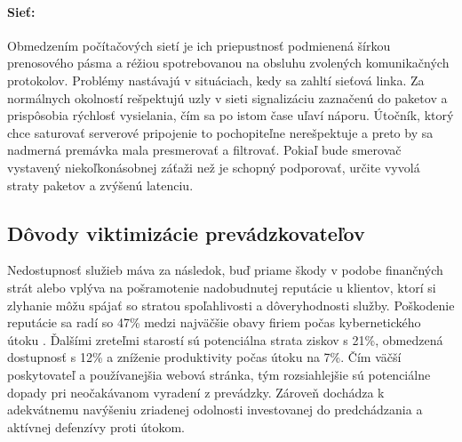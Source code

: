 \documentclass[12pt, a4paper]{article}
\begin{document}
\paragraph{Sieť:}
Obmedzením počítačových sietí je ich priepustnosť podmienená šírkou prenosového pásma a réžiou 
spotrebovanou na obsluhu zvolených komunikačných protokolov. Problémy nastávajú v situáciach, kedy sa 
zahltí sieťová linka. Za normálnych okolností rešpektujú uzly v sieti signalizáciu zaznačenú do 
paketov a prispôsobia rýchlosť vysielania, čím sa po istom čase uľaví náporu. Útočník, ktorý chce saturovať 
serverové pripojenie to  pochopiteľne nerešpektuje a preto by sa nadmerná premávka mala presmerovať a 
filtrovať. Pokiaľ bude smerovač vystavený niekoľkonásobnej záťaži než je schopný podporovať, určite vyvolá 
straty paketov a zvýšenú latenciu.

\subsection{Dôvody viktimizácie prevádzkovateľov}
Nedostupnosť služieb máva za následok, buď priame škody v podobe finančných strát alebo vplýva na 
pošramotenie nadobudnutej reputácie u klientov, ktorí si zlyhanie môžu spájať so stratou spoľahlivosti a 
dôveryhodnosti služby. Poškodenie reputácie sa radí so 47\% medzi najväčšie obavy firiem počas 
kybernetického útoku \cite{radware-ddos}. Ďalšími zreteľmi starostí sú potenciálna strata ziskov s 21\%, 
obmedzená dostupnosť s 12\% a zníženie produktivity počas útoku na 7\%. Čím väčší poskytovateľ a 
používanejšia webová stránka, tým rozsiahlejšie sú potenciálne dopady pri neočakávanom vyradení z prevádzky. 
Zároveň dochádza k adekvátnemu navýšeniu zriadenej odolnosti investovanej do predchádzania a aktívnej 
defenzívy proti útokom. 
\end{document}
